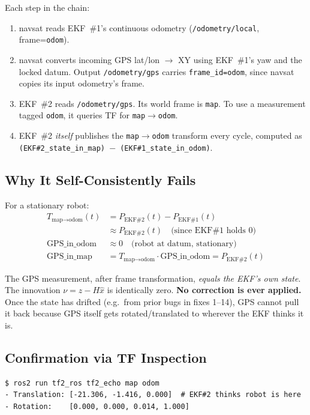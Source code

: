 \documentclass[11pt,a4paper]{article}
\begin{document}
\noindent
Each step in the chain:
\begin{enumerate}[noitemsep]
\item navsat reads EKF~\#1's continuous odometry (\texttt{/odometry/local}, frame=\texttt{odom}).
\item navsat converts incoming GPS lat/lon $\to$ XY using EKF~\#1's yaw and the locked datum.
      Output \texttt{/odometry/gps} carries \texttt{frame\_id=odom}, since navsat copies its
      input odometry's frame.
\item EKF~\#2 reads \texttt{/odometry/gps}. Its world frame is \texttt{map}. To use a measurement
      tagged \texttt{odom}, it queries TF for \texttt{map$\to$odom}.
\item EKF~\#2 \emph{itself} publishes the \texttt{map$\to$odom} transform every cycle, computed as
      \texttt{(EKF\#2\_state\_in\_map) $-$ (EKF\#1\_state\_in\_odom)}.
\end{enumerate}

\subsection{Why It Self-Consistently Fails}

For a stationary robot:
\begin{align*}
T_{\text{map}\to\text{odom}}(t)
  &= P_{\text{EKF\#2}}(t) - P_{\text{EKF\#1}}(t) \\
  &\approx P_{\text{EKF\#2}}(t) \quad \text{(since EKF\#1 holds 0)} \\[4pt]
\text{GPS\_in\_odom} &\approx 0 \quad \text{(robot at datum, stationary)} \\[4pt]
\text{GPS\_in\_map}  &= T_{\text{map}\to\text{odom}} \cdot \text{GPS\_in\_odom}
                      = P_{\text{EKF\#2}}(t)
\end{align*}

\noindent
The GPS measurement, after frame transformation, \emph{equals the EKF's own state}. The
innovation $\nu = z - H\hat{x}$ is identically zero. \textbf{No correction is ever applied.}
Once the state has drifted (e.g.\ from prior bugs in fixes 1--14), GPS cannot pull it back
because GPS itself gets rotated/translated to wherever the EKF thinks it is.

\subsection{Confirmation via TF Inspection}

\begin{lstlisting}
$ ros2 run tf2_ros tf2_echo map odom
- Translation: [-21.306, -1.416, 0.000]  # EKF#2 thinks robot is here
- Rotation:    [0.000, 0.000, 0.014, 1.000]
\end{lstlisting}
\end{document}
